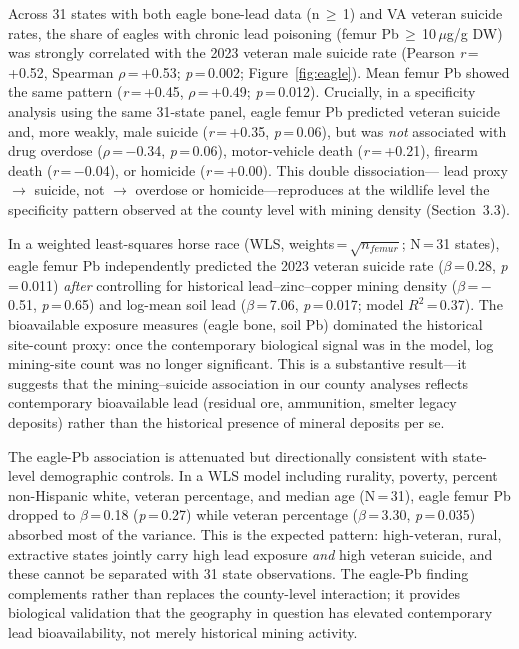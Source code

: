 \documentclass[11pt,twocolumn]{article}
\begin{document}
Across 31 states with both eagle bone-lead data (n\,$\geq$\,1) and VA veteran suicide rates, the share of eagles with chronic lead poisoning (femur Pb\,$\geq$\,10\,$\mu$g/g DW) was strongly correlated with the 2023 veteran male suicide rate (Pearson \textit{r}\,=\,+0.52, Spearman $\rho$\,=\,+0.53; \textit{p}\,=\,0.002; Figure~\ref{fig:eagle}). Mean femur Pb showed the same pattern (\textit{r}\,=\,+0.45, $\rho$\,=\,+0.49; \textit{p}\,=\,0.012). Crucially, in a specificity analysis using the same 31-state panel, eagle femur Pb predicted veteran suicide and, more weakly, male suicide (\textit{r}\,=\,+0.35, \textit{p}\,=\,0.06), but was \textit{not} associated with drug overdose ($\rho$\,=\,$-$0.34, \textit{p}\,=\,0.06), motor-vehicle death (\textit{r}\,=\,+0.21), firearm death (\textit{r}\,=\,$-$0.04), or homicide (\textit{r}\,=\,+0.00). This double dissociation--- lead proxy $\rightarrow$ suicide, not $\rightarrow$ overdose or homicide---reproduces at the wildlife level the specificity pattern observed at the county level with mining density (Section~3.3).

In a weighted least-squares horse race (WLS, weights\,=\,$\sqrt{n_{femur}}$; N\,=\,31 states), eagle femur Pb independently predicted the 2023 veteran suicide rate ($\beta$\,=\,0.28, \textit{p}\,=\,0.011) \textit{after} controlling for historical lead--zinc--copper mining density ($\beta$\,=\,$-$0.51, \textit{p}\,=\,0.65) and log-mean soil lead ($\beta$\,=\,7.06, \textit{p}\,=\,0.017; model $R^2$\,=\,0.37). The bioavailable exposure measures (eagle bone, soil Pb) dominated the historical site-count proxy: once the contemporary biological signal was in the model, log mining-site count was no longer significant. This is a substantive result---it suggests that the mining--suicide association in our county analyses reflects contemporary bioavailable lead (residual ore, ammunition, smelter legacy deposits) rather than the historical presence of mineral deposits per se.

The eagle-Pb association is attenuated but directionally consistent with state-level demographic controls. In a WLS model including rurality, poverty, percent non-Hispanic white, veteran percentage, and median age (N\,=\,31), eagle femur Pb dropped to $\beta$\,=\,0.18 (\textit{p}\,=\,0.27) while veteran percentage ($\beta$\,=\,3.30, \textit{p}\,=\,0.035) absorbed most of the variance. This is the expected pattern: high-veteran, rural, extractive states jointly carry high lead exposure \textit{and} high veteran suicide, and these cannot be separated with 31 state observations. The eagle-Pb finding complements rather than replaces the county-level interaction; it provides biological validation that the geography in question has elevated contemporary lead bioavailability, not merely historical mining activity.
\end{document}
